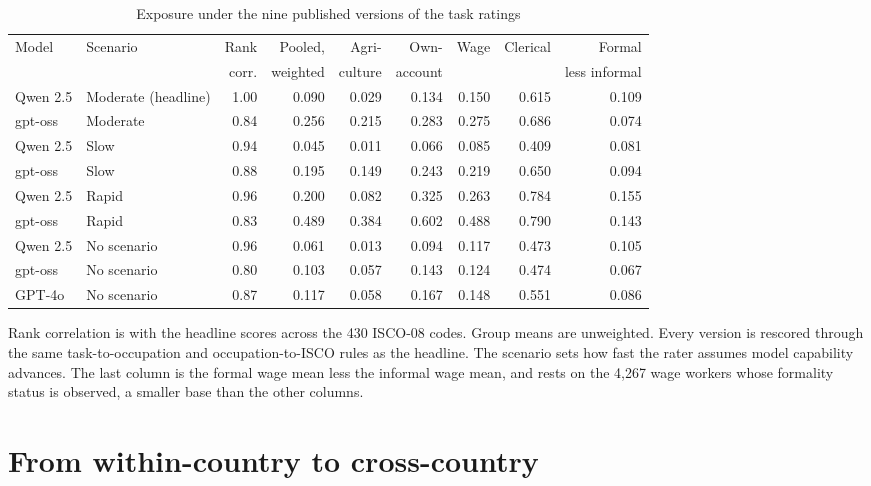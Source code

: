 \begin{table}[ht]
\centering
\caption{Exposure under the nine published versions of the task ratings}
\label{tab:variants}
\footnotesize
\setlength{\tabcolsep}{4pt}
\begin{tabular}{llrrrrrrr}
\toprule
Model & Scenario & Rank & Pooled, & Agri- & Own- & Wage & Clerical & Formal \\
      &          & corr. & weighted & culture & account &      &  & less informal \\
\midrule
Qwen 2.5 & Moderate (headline) & 1.00 & 0.090 & 0.029 & 0.134 & 0.150 & 0.615 & 0.109 \\
gpt-oss  & Moderate            & 0.84 & 0.256 & 0.215 & 0.283 & 0.275 & 0.686 & 0.074 \\
Qwen 2.5 & Slow                & 0.94 & 0.045 & 0.011 & 0.066 & 0.085 & 0.409 & 0.081 \\
gpt-oss  & Slow                & 0.88 & 0.195 & 0.149 & 0.243 & 0.219 & 0.650 & 0.094 \\
Qwen 2.5 & Rapid               & 0.96 & 0.200 & 0.082 & 0.325 & 0.263 & 0.784 & 0.155 \\
gpt-oss  & Rapid               & 0.83 & 0.489 & 0.384 & 0.602 & 0.488 & 0.790 & 0.143 \\
Qwen 2.5 & No scenario         & 0.96 & 0.061 & 0.013 & 0.094 & 0.117 & 0.473 & 0.105 \\
gpt-oss  & No scenario         & 0.80 & 0.103 & 0.057 & 0.143 & 0.124 & 0.474 & 0.067 \\
GPT-4o   & No scenario         & 0.87 & 0.117 & 0.058 & 0.167 & 0.148 & 0.551 & 0.086 \\
\bottomrule
\end{tabular}

\vspace{4pt}
\begin{minipage}{0.94\linewidth}
\footnotesize
Rank correlation is with the headline scores across the 430 ISCO-08 codes.
Group means are unweighted. Every version is rescored through the same
task-to-occupation and occupation-to-ISCO rules as the headline. The scenario
sets how fast the rater assumes model capability advances. The last column is
the formal wage mean less the informal wage mean, and rests on the 4,267 wage
workers whose formality status is observed, a smaller base than the other
columns.
\end{minipage}
\end{table}

\section{From within-country to cross-country}
\label{sec:cross}

